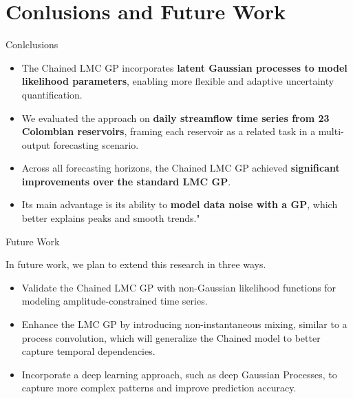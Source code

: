 \section{Conlusions and Future Work}

\begin{frame}{Conlclusions}
	
	\begin{block}{}
	\begin{itemize}
		\item The Chained LMC GP incorporates \textcolor{BrandTeal}{\textbf{latent Gaussian processes to model likelihood parameters}}, enabling more flexible and adaptive uncertainty quantification. 
		\item We evaluated the approach on \textcolor{BrandTeal}{\textbf{daily streamflow time series from 23 Colombian reservoirs}}, framing each reservoir as a related task in a multi-output forecasting scenario.  
		\item Across all forecasting horizons, the Chained LMC GP achieved \textcolor{BrandTeal}{\textbf{significant improvements over the standard LMC GP}}. 
		\item Its main advantage is its ability to \textcolor{BrandTeal}{\textbf{model data noise with a GP}}, which better explains peaks and smooth trends." 
	\end{itemize}
	\end{block}
\end{frame}

\begin{frame}{Future Work}
	\begin{block}{}
		In future work, we plan to extend this research in three ways.
		
		\begin{itemize}
			 \item Validate the Chained LMC GP with non-Gaussian likelihood functions for modeling amplitude-constrained time series. 
			 \item Enhance the LMC GP by introducing non-instantaneous mixing, similar to a process convolution, which will generalize the Chained model to better capture temporal dependencies.
			 \item Incorporate a deep learning approach, such as deep Gaussian Processes, to capture more complex patterns and improve prediction accuracy.
		\end{itemize} 
	\end{block}
\end{frame}

